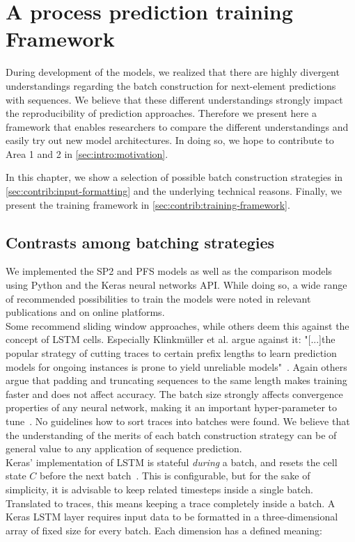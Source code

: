 \chapter{A process prediction training Framework}\label{chap:training-framework}
During development of the models, we realized that there are highly divergent understandings regarding the batch construction for next-element predictions with sequences. We believe that these different understandings strongly impact the reproducibility of prediction approaches. Therefore we present here a framework that enables researchers to compare the different understandings and easily try out new model architectures. In doing so, we hope to contribute to Area 1 and 2 in \autoref{sec:intro:motivation}.

In this chapter, we show a selection of possible batch construction strategies in \autoref{sec:contrib:input-formatting} and the underlying technical reasons. Finally, we present the training framework in \autoref{sec:contrib:training-framework}.

\section{Contrasts among batching strategies}\label{sec:contrib:input-formatting}
We implemented the SP2 and PFS models as well as the comparison models using Python and the Keras neural networks API. While doing so, a wide range of recommended possibilities to train the models were noted in relevant publications and on online platforms.\\

Some recommend sliding window approaches, while others deem this against the concept of LSTM cells. Especially Klinkmüller et al. argue against it: "[...]the popular strategy of cutting traces to certain prefix lengths to learn prediction models for ongoing instances is prone to yield unreliable models"~\cite{klinkmuller2018reliablemonitoring}. Again others argue that padding and truncating sequences to the same length makes training faster and does not affect accuracy. The batch size strongly affects convergence properties of any neural network, making it an important hyper-parameter to tune~\cite{keskar2016large}. No guidelines how to sort traces into batches were found. We believe that the understanding of the merits of each batch construction strategy can be of general value to any application of sequence prediction.\\

Keras' implementation of LSTM is stateful \textit{during} a batch, and resets the cell state $C$ before the next batch~\cite{web:keras}. This is configurable, but for the sake of simplicity, it is advisable to keep related timesteps inside a single batch. Translated to traces, this means keeping a trace completely inside a batch. A Keras LSTM layer requires input data to be formatted in a three-dimensional array of fixed size for every batch. Each dimension has a defined meaning:

